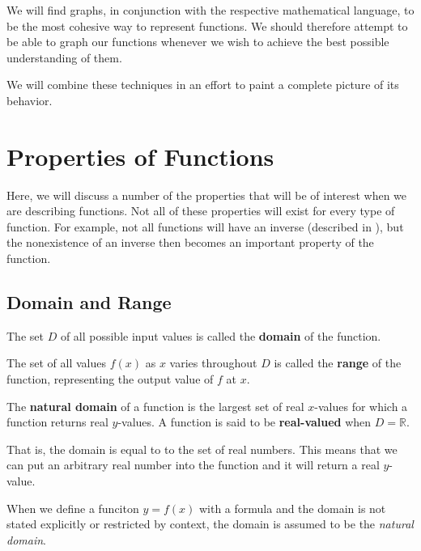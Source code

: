 We will find graphs, in conjunction with the respective mathematical language, 
to be the most cohesive way to represent functions.
We should therefore attempt to be able to graph our functions whenever we wish to achieve the best possible understanding of them.

We will combine these techniques in an effort to paint a complete picture of its 
behavior.

\section{Properties of Functions}

Here, we will discuss a number of the properties that will be of interest when we
are describing functions.
Not all of these properties will exist for every type of function.
For example, not all functions will have an inverse 
(described in ), 
but the nonexistence of an inverse then becomes an important property of the 
function. %

\subsection{Domain and Range}

\begin{defn}
    The set $D$ of all possible input values is called the \textbf{domain} of 
    the function.
\end{defn}

\begin{defn}
    The set of all values $f(x)$ as $x$ varies throughout $D$ is called 
    the \textbf{range} of the function,
    representing the output value of $f$ at $x$.
\end{defn}

\begin{defn}
    The \textbf{natural domain} of a function is the largest set of real 
    $x$-values for which a function returns real $y$-values.
    A function is said to be \textbf{real-valued} when $D = \mathbb{R}$.
\end{defn}
That is, the domain is equal to to the set of real numbers.
This means that we can put an arbitrary real number into the function and it 
will return a real $y$-value.

 \begin{remark}
     When we define a funciton $y=f(x)$ with a formula and the domain is not 
     stated explicitly or restricted by context, the domain is assumed to be the 
     \emph{natural domain}.
   \end{remark}

